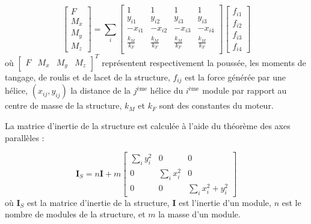 \[
\begin{bmatrix}F\\ M_{x}\\ M_{y}\\ M_{z}\end{bmatrix}=\sum_{i}\begin{bmatrix}1&1&1&1\\ y_{i1}&y_{i2}&y_{i3}&y_{i3}\\ -x_{i1}&-x_{i2}&-x_{i3}&-x_{i4}\\ \frac{k_{M}}{k_{F}}&\frac{k_{M}}{k_{F}}&\frac{k_{M}}{k_{F}}&\frac{k_{M}}{k_{F}} \\ \end{bmatrix}\begin{bmatrix}f_{i1}\\ f_{i2}\\ f_{i3}\\ f_{i4}\end{bmatrix}
\]
où \(\begin{bmatrix}F&M_{x}&M_{y}&M_{z}\end{bmatrix}^{T}\) représentent respectivement la poussée, les moments de tangage, de roulis et de lacet de la structure, \(f_{ij}\) est la force générée par une hélice, \((x_{ij},y_{ij})\) la distance de la \(j^{\text{ème}}\) hélice du \(i^{\text{ème}}\) module par rapport au centre de masse de la structure, \(k_{M}\) et \(k_{F}\) sont des constantes du moteur.

\noindent La matrice d'inertie de la structure est calculée à l'aide du théorème des axes parallèles :

\[
\mathbf{I}_{S}=n\mathbf{I}+m\begin{bmatrix}\sum_{i}y_{i}^{2}&0&0\\ 0&\sum_{i}x_{i}^{2}&0\\ 0&0&\sum_{i}x_{i}^{2}+y_{i}^{2}\end{bmatrix}
\]
où \(\mathbf{I}_{S}\) est la matrice d'inertie de la structure, \(\mathbf{I}\) est l'inertie d'un module, \(n\) est le nombre de modules de la structure, et \(m\) la masse d'un module. 


